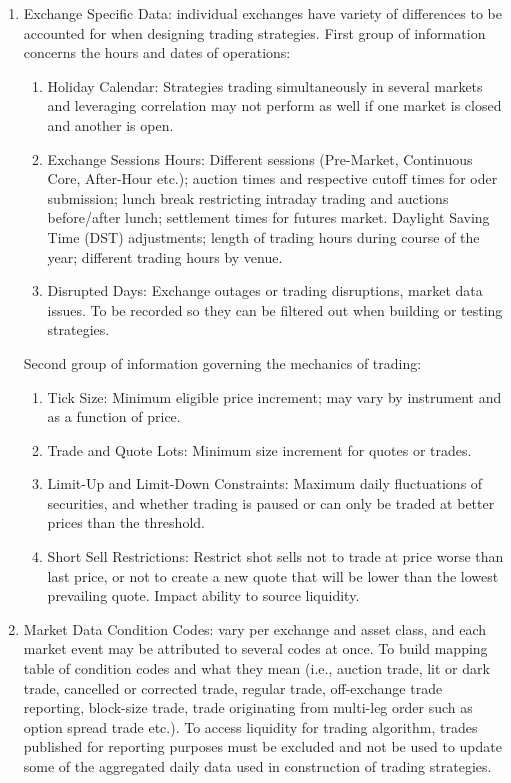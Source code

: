 \begin{enumerate}[label=\roman*.]
\item Exchange Specific Data: individual exchanges have variety of differences to be accounted for when designing trading strategies. First group of information concerns the hours and dates of operations:
\begin{enumerate}[label=\arabic*.]
\setlength{\itemsep}{0pt}
\item Holiday Calendar: Strategies trading simultaneously in several markets and leveraging correlation may not perform as well if one market is closed and another is open.
\item Exchange Sessions Hours: Different sessions (Pre-Market, Continuous Core, After-Hour etc.); auction times and respective cutoff times for oder submission; lunch break restricting intraday trading and auctions before/after lunch; settlement times for futures market. Daylight Saving Time (DST) adjustments; length of trading hours during course of the year; different trading hours by venue.
\item Disrupted Days: Exchange outages or trading disruptions, market data issues. To be recorded so they can be filtered out when building or testing strategies.
\end{enumerate}
Second group of information governing the mechanics of trading:
\begin{enumerate}[label=\arabic*.]
\setlength{\itemsep}{0pt}
\item Tick Size: Minimum eligible price increment; may vary by instrument and as a function of price.
\item Trade and Quote Lots: Minimum size increment for quotes or trades.
\item Limit-Up and Limit-Down Constraints: Maximum daily fluctuations of securities, and whether trading is paused or can only be traded at better prices than the threshold.
\item Short Sell Restrictions: Restrict shot sells not to trade at price worse than last price, or not to create a new quote that will be lower than the lowest prevailing quote. Impact ability to source liquidity.
\end{enumerate}
\item Market Data Condition Codes: vary per exchange and asset class, and each market event may be attributed to several codes at once. To build mapping table of condition codes and what they mean (i.e., auction trade, lit or dark trade, cancelled or corrected trade, regular trade, off-exchange trade reporting, block-size trade, trade originating from multi-leg order such as option spread trade etc.). To access liquidity for trading algorithm, trades published for reporting purposes must be excluded and not be used to update some of the aggregated daily data used in construction of trading strategies.

\end{enumerate}
